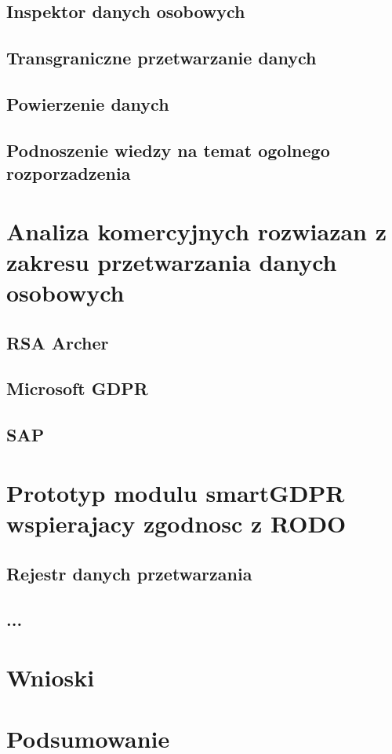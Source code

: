 \documentclass[en, noamssymb]{mgr}
\begin{document}
\section{Inspektor danych osobowych}
\section{Transgraniczne przetwarzanie danych}
\section{Powierzenie danych}
\section{Podnoszenie wiedzy na temat ogolnego rozporzadzenia}

\chapter{Analiza komercyjnych rozwiazan z zakresu przetwarzania danych osobowych} \label{sec:sekcjaAnalizaRozwiazan}
\section{RSA Archer}
\section{Microsoft GDPR}
\section{SAP}

\chapter{Prototyp modulu smartGDPR wspierajacy zgodnosc z RODO} \label{sec:sekcjaOpisPrototypu}
\section{Rejestr danych przetwarzania}
\section{...}

\chapter{Wnioski} \label{sec:sekcjaWnioski}

\chapter{Podsumowanie}
\label{sec:Podsumowanie}

\end{document}
